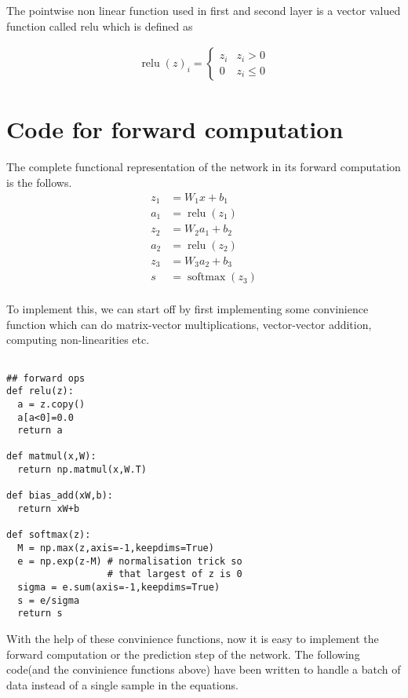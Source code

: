 \documentclass[10pt]{article}
\begin{document}
The pointwise non linear function used in first and second layer is a vector valued function called relu which is defined as

$$ \begin{aligned}
  \operatorname{relu}(z)_i = \begin{cases} z_i &z_i>0\\0&z_i\leq 0 \end{cases}
\end{aligned} $$


\section{Code for forward computation}
The complete functional representation of the network in its forward computation is the follows. 
$$ \begin{aligned}
  z_1 &= W_1x+b_1 \\  a_1 &= \operatorname{relu}(z_1)\\
  z_2 &= W_2a_1+b_2 \\  a_2 &= \operatorname{relu}(z_2)\\
  z_3 &= W_3a_2+b_3 \\  s &= \operatorname{softmax}(z_3)\\
\end{aligned} $$

To implement this, we can start off by first implementing some convinience function which can do matrix-vector multiplications, vector-vector addition, computing non-linearities etc.

\begin{verbatim}

## forward ops
def relu(z):
  a = z.copy()
  a[a<0]=0.0
  return a

def matmul(x,W):
  return np.matmul(x,W.T)

def bias_add(xW,b):
  return xW+b

def softmax(z):
  M = np.max(z,axis=-1,keepdims=True)
  e = np.exp(z-M) # normalisation trick so 
                  # that largest of z is 0
  sigma = e.sum(axis=-1,keepdims=True)
  s = e/sigma
  return s
\end{verbatim}

With the help of these convinience functions, now it is easy to implement the forward computation or the prediction step of the network. The following code(and the convinience functions above) have been written to handle a batch of data instead of a single sample in the equations. 
\end{document}
